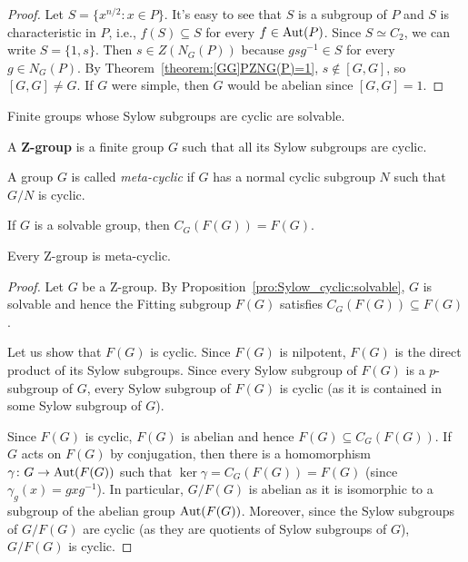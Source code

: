 \begin{proof}
	Let $S=\{x^{n/2}:x\in P\}$. It's easy to see that $S$ is a subgroup of $P$ and $S$ is characteristic in $P$, i.e., $f(S)\subseteq S$ for every $f\in\operatorname{Aut}(P)$. Since $S\simeq C_2$, we can write $S=\{1,s\}$. Then $s\in Z(N_G(P))$ because $gsg^{-1}\in S$ for every $g\in N_G(P)$. By Theorem~\ref{theorem:[GG]PZNG(P)=1}, $s\not\in[G,G]$, so $[G,G]\ne G$. If $G$ were simple, then $G$ would be abelian since $[G,G]=1$.
\end{proof}

Finite groups whose Sylow subgroups are cyclic are solvable.

\begin{definition}
	A \textbf{Z-group} is a finite group $G$ such that all its Sylow subgroups are cyclic.
\end{definition}

\begin{definition}
A group $G$ is called \emph{meta-cyclic} if $G$ has a normal cyclic subgroup $N$ such that $G/N$ is cyclic.
\end{definition}

\begin{exercise}
	If $G$ is a solvable group, then $C_G(F(G))=F(G)$.
\end{exercise}

\begin{theorem}
	\label{theorem:Z=>metacyclic}
	Every Z-group is meta-cyclic.
\end{theorem}

\begin{proof}
	Let $G$ be a Z-group. By Proposition~\ref{pro:Sylow_cyclic:solvable}, $G$ is solvable and hence the Fitting subgroup $F(G)$ satisfies $C_G(F(G))\subseteq F(G)$. 
	
	Let us show that $F(G)$ is cyclic. Since $F(G)$ is nilpotent, $F(G)$ is the direct product of its Sylow subgroups. Since every Sylow subgroup of $F(G)$ is a $p$-subgroup of $G$, every Sylow subgroup of $F(G)$ is cyclic (as it is contained in some Sylow subgroup of $G$). 
	
	Since $F(G)$ is cyclic, $F(G)$ is abelian and hence $F(G)\subseteq C_G(F(G))$. If $G$ acts on $F(G)$ by conjugation, then there is a homomorphism $\gamma\colon G\to\operatorname{Aut}(F(G))$ such that $\ker\gamma=C_G(F(G))=F(G)$ (since $\gamma_g(x)=gxg^{-1}$). In particular, $G/F(G)$ is abelian as it is isomorphic to a subgroup of the abelian group $\operatorname{Aut}(F(G))$. Moreover, since the Sylow subgroups of $G/F(G)$ are cyclic (as they are quotients of Sylow subgroups of $G$), $G/F(G)$ is cyclic.
\end{proof}

